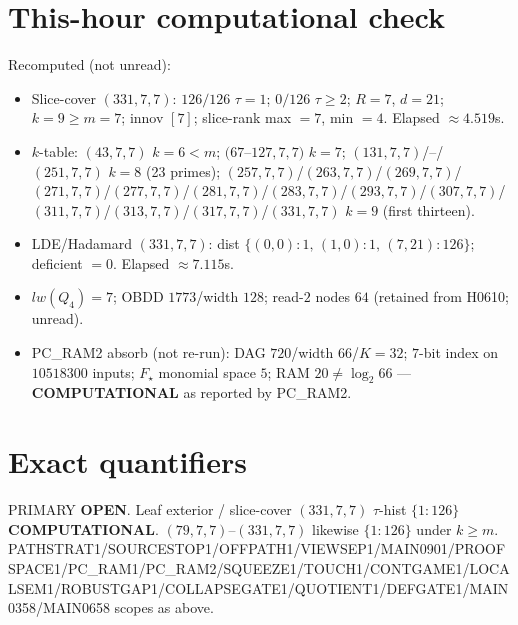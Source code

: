 \documentclass[11pt]{article}
\begin{document}
\section*{This-hour computational check}
Recomputed (not unread):
\begin{itemize}
\item Slice-cover $(331,7,7)$: $126/126$ $\tau{=}1$; $0/126$ $\tau{\ge}2$; $R{=}7$, $d{=}21$;
  $k{=}9{\ge}m{=}7$; innov $[7]$; slice-rank max $=7$, min $=4$. Elapsed $\approx4.519$s.
\item $k$-table: $(43,7,7)$ $k{=}6{<}m$; $(67$--$127,7,7)$ $k{=}7$;
  $(131,7,7)$/--/$(251,7,7)$ $k{=}8$ (23 primes); $(257,7,7)$/$(263,7,7)$/$(269,7,7)$/$(271,7,7)$/$(277,7,7)$/$(281,7,7)$/$(283,7,7)$/$(293,7,7)$/$(307,7,7)$/$(311,7,7)$/$(313,7,7)$/$(317,7,7)$/$(331,7,7)$ $k{=}9$ (first thirteen).
\item LDE/Hadamard $(331,7,7)$: dist $\{(0,0){:}1,\,(1,0){:}1,\,(7,21){:}126\}$; deficient $=0$. Elapsed $\approx7.115$s.
\item $lw(Q_4)=7$; OBDD $1773$/width $128$; read-$2$ nodes $64$ (retained from H0610; unread).
\item PC\_RAM2 absorb (not re-run): DAG $720$/width $66$/$K{=}32$; $7$-bit index on $10518300$ inputs; $F_\star$ monomial space $5$; RAM $20\neq\log_2 66$ --- \textbf{COMPUTATIONAL} as reported by PC\_RAM2.
\end{itemize}

\section*{Exact quantifiers}
PRIMARY \textbf{OPEN}. Leaf exterior / slice-cover $(331,7,7)$ $\tau$-hist $\{1{:}126\}$ \textbf{COMPUTATIONAL}.
$(79,7,7)$--$(331,7,7)$ likewise $\{1{:}126\}$ under $k{\ge}m$.
PATHSTRAT1/SOURCESTOP1/OFFPATH1/VIEWSEP1/MAIN0901/PROOFSPACE1/PC\_RAM1/PC\_RAM2/SQUEEZE1/TOUCH1/CONTGAME1/LOCALSEM1/ROBUSTGAP1/COLLAPSEGATE1/QUOTIENT1/DEFGATE1/MAIN0358/MAIN0658 scopes as above.
\end{document}
